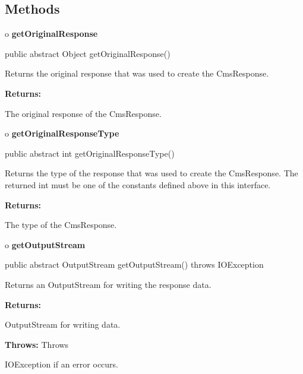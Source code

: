 \subsection*{  Methods }

o {\bf getOriginalResponse} 

\begin{PRE}
 public abstract Object getOriginalResponse()
\end{PRE}

\begin{description}
\htmlDD Returns the original response that was used to create the CmsResponse.


\begin{description}
\item {\bf Returns:}  

The original response of the CmsResponse.  
\end{description}

\end{description}

o {\bf getOriginalResponseType} 

\begin{PRE}
 public abstract int getOriginalResponseType()
\end{PRE}

\begin{description}
\htmlDD Returns the type of the response that was used to create the
CmsResponse. The returned int must be one of the constants defined above in
this interface. 

\begin{description}
\item {\bf Returns:}  

The type of the CmsResponse.  
\end{description}

\end{description}

o {\bf getOutputStream} 

\begin{PRE}
 public abstract OutputStream getOutputStream() throws IOException
\end{PRE}

\begin{description}
\htmlDD Returns an OutputStream for writing the response data. 

\begin{description}
\item {\bf Returns:}  

OutputStream for writing data.  
\item {\bf Throws:} Throws  

IOException if an error occurs.  
\end{description}

\end{description}

